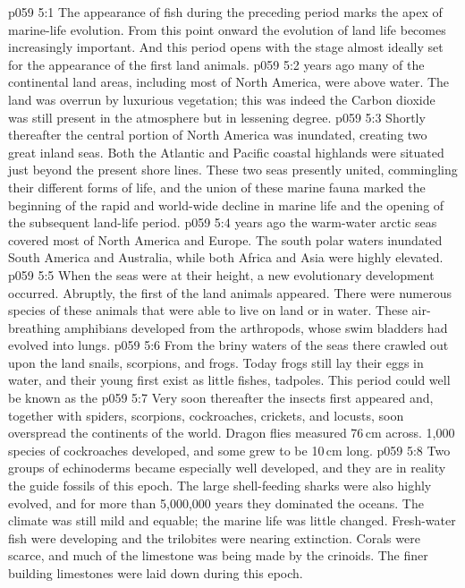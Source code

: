 \vs p059 5:1 The appearance of fish during the preceding period marks the apex of marine\hyp{}life evolution. From this point onward the evolution of land life becomes increasingly important. And this period opens with the stage almost ideally set for the appearance of the first land animals.
\vs p059 5:2 \pc {} years ago many of the continental land areas, including most of North America, were above water. The land was overrun by luxurious vegetation; this was indeed the  Carbon dioxide was still present in the atmosphere but in lessening degree.
\vs p059 5:3 Shortly thereafter the central portion of North America was inundated, creating two great inland seas. Both the Atlantic and Pacific coastal highlands were situated just beyond the present shore lines. These two seas presently united, commingling their different forms of life, and the union of these marine fauna marked the beginning of the rapid and world\hyp{}wide decline in marine life and the opening of the subsequent land\hyp{}life period.
\vs p059 5:4 \pc {} years ago the warm\hyp{}water arctic seas covered most of North America and Europe. The south polar waters inundated South America and Australia, while both Africa and Asia were highly elevated.
\vs p059 5:5 When the seas were at their height, a new evolutionary development  occurred. Abruptly, the first of the land animals appeared. There were numerous species of these animals that were able to live on land or in water. These air\hyp{}breathing amphibians developed from the arthropods, whose swim bladders had evolved into lungs.
\vs p059 5:6 From the briny waters of the seas there crawled out upon the land snails, scorpions, and frogs. Today frogs still lay their eggs in water, and their young first exist as little fishes, tadpoles. This period could well be known as the 
\vs p059 5:7 Very soon thereafter the insects first appeared and, together with spiders, scorpions, cockroaches, crickets, and locusts, soon overspread the continents of the world. Dragon flies measured 76\,cm across. 1,000 species of cockroaches developed, and some grew to be 10\,cm long.
\vs p059 5:8 Two groups of echinoderms became especially well developed, and they are in reality the guide fossils of this epoch. The large shell\hyp{}feeding sharks were also highly evolved, and for more than 5,000,000 years they dominated the oceans. The climate was still mild and equable; the marine life was little changed. Fresh\hyp{}water fish were developing and the trilobites were nearing extinction. Corals were scarce, and much of the limestone was being made by the crinoids. The finer building limestones were laid down during this epoch.
